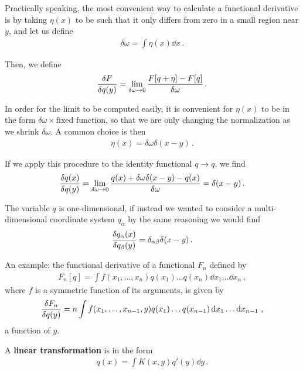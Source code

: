 \documentclass[main.tex]{subfiles}
\begin{document}
Practically speaking, the most convenient way to calculate a functional derivative is by taking \(\eta (x)\) to be such that it only differs from zero in a small region near \(y\), and let us define 
%
\begin{align}
\delta \omega = \int \eta (x) \dd{x}
\,.
\end{align}

Then, we define 
%
\begin{align}
\fdv{F}{q(y)} = \lim_{ \delta \omega \to 0} \frac{F[q + \eta ] - F[q]}{ \delta \omega }
\,.
\end{align}

In order for the limit to be computed easily, it is convenient for \(\eta (x)\) to be in the form \(\delta \omega \times \text{fixed function}\),
so that we are only changing the normalization as we shrink \(\delta \omega \).
A common choice is then 
%
\begin{align}
\eta (x) = \delta \omega  \delta (x-y)
\,.
\end{align}

If we apply this procedure to the identity functional \(q \to q\), we find 
%
\begin{align}
\fdv{q(x)}{q(y)} = \lim_{ \delta \omega  \to 0} \frac{q (x) + \delta \omega \delta (x-y) -q (x)}{ \delta \omega } = \delta (x-y)
\,.
\end{align}

The variable \(q\) is one-dimensional, if instead we wanted to consider a multi-dimensional coordinate system \(q_\alpha \) by the same reasoning we would find 
%
\begin{align}
\fdv{q_\alpha (x)}{q_\beta (y)} = \delta_{\alpha \beta } \delta (x-y)
\,.
\end{align}

An example: the functional derivative of a functional \(F_n\) defined by 
%
\begin{align}
F_n[q] = \int f(x_1 , \dots, x_n) q(x_1 )\dots q(x_n) \dd{x_1} \dots \dd{x_n}
\,,
\end{align}
%
where \(f\) is a symmetric function of its arguments, is given by 
%
\begin{align}
\fdv{F_n}{q(y)} = n \int f(x_1, \dots, x_{n-1}, y) q(x_1 )\dots q(x_{n-1}) \dd{x_1 } \dots \dd{x_{n-1}}
\,,
\end{align}
%
a function of \(y\). 

A \textbf{linear transformation} is in the form 
%
\begin{align}
q(x) = \int K(x, y) q'(y) \dd{y}
\,.
\end{align}
\end{document}
